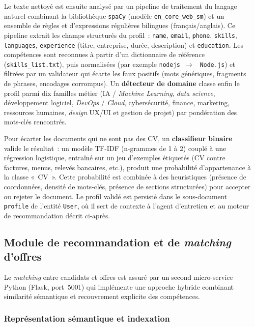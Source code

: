 Le texte nettoyé est ensuite analysé par un pipeline de traitement du langage naturel combinant
la bibliothèque \texttt{spaCy} (modèle \texttt{en\_core\_web\_sm}) et un ensemble de règles et
d'expressions régulières bilingues (français/anglais). Ce pipeline extrait les champs
structurés du profil~: \texttt{name}, \texttt{email}, \texttt{phone}, \texttt{skills},
\texttt{languages}, \texttt{experience} (titre, entreprise, durée, description) et
\texttt{education}. Les compétences sont reconnues à partir d'un dictionnaire de référence
(\texttt{skills\_\allowbreak list.txt}), puis normalisées (par exemple \texttt{nodejs}~$\rightarrow$~%
\texttt{Node.js}) et filtrées par un validateur qui écarte les faux positifs (mots génériques,
fragments de phrases, encodages corrompus). Un \textbf{détecteur de domaine} classe enfin le
profil parmi dix familles métier (IA / \textit{Machine Learning}, \textit{data science},
développement logiciel, \textit{DevOps} / \textit{Cloud}, cybersécurité, finance, marketing,
ressources humaines, \textit{design} UX/UI et gestion de projet) par pondération des mots-clés rencontrés.

Pour écarter les documents qui ne sont pas des CV, un \textbf{classifieur binaire} valide le
résultat~: un modèle TF-IDF (n-grammes de 1 à 2) couplé à une régression logistique, entraîné
sur un jeu d'exemples étiquetés (CV contre factures, menus, relevés bancaires, etc.), produit
une probabilité d'appartenance à la classe «~CV~». Cette probabilité est combinée à des
heuristiques (présence de coordonnées, densité de mots-clés, présence de sections structurées)
pour accepter ou rejeter le document. Le profil validé est persisté dans le sous-document
\texttt{profile} de l'entité \texttt{User}, où il sert de contexte à l'agent d'entretien et au
moteur de recommandation décrit ci-après.

\subsection{Module de recommandation et de \textit{matching} d'offres}

Le \textit{matching} entre candidats et offres est assuré par un second micro-service Python
(Flask, port~5001) qui implémente une approche hybride combinant similarité sémantique et
recouvrement explicite des compétences.

\subsubsection{Représentation sémantique et indexation}

